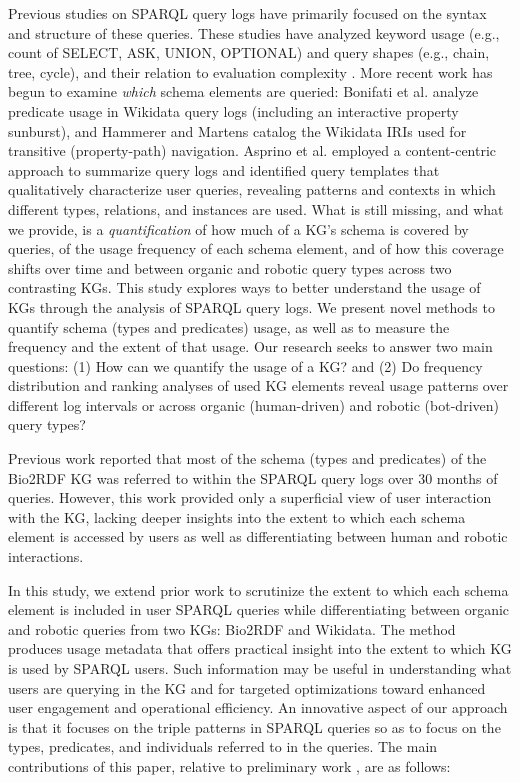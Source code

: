 \documentclass[sw]{iosart2x}
\begin{document}
Previous studies on SPARQL query logs have primarily focused on the syntax and structure of these queries. These studies have analyzed keyword usage (e.g., count of SELECT, ASK, UNION, OPTIONAL) and query shapes (e.g., chain, tree, cycle), and their relation to evaluation complexity \cite{bonifati2020analytical, buil2015preliminary, saleem2015lsq,stadler2024lsq}. More recent work has begun to examine \emph{which} schema elements are queried: Bonifati et al. \cite{bonifati2019navigating} analyze predicate usage in Wikidata query logs (including an interactive property sunburst), and Hammerer and Martens \cite{hammerer2025compendium} catalog the Wikidata IRIs used for transitive (property-path) navigation. Asprino et al. \cite{asprino2023your} employed a content-centric approach to summarize query logs and identified query templates that qualitatively characterize user queries, revealing patterns and contexts in which different types, relations, and instances are used. What is still missing, and what we provide, is a \emph{quantification} of how much of a KG's schema is covered by queries, of the usage frequency of each schema element, and of how this coverage shifts over time and between organic and robotic query types across two contrasting KGs.
This study explores ways to better understand the usage of KGs through the analysis of SPARQL query logs. We present novel methods to quantify schema (types and predicates) usage, as well as to measure the frequency and the extent of that usage. Our research seeks to answer two main questions: (1) How can we quantify the usage of a KG? and (2) Do frequency distribution and ranking analyses of used KG elements reveal usage patterns over different log intervals or across organic (human-driven) and robotic (bot-driven) query types?

Previous work \cite{mohammadi2024analyzing} reported that most of the schema (types and predicates) of the Bio2RDF KG was referred to within the SPARQL query logs over 30 months of queries. However, this work provided only a superficial view of user interaction with the KG, lacking deeper insights into the extent to which each schema element is accessed by users as well as differentiating between human and robotic interactions. 

In this study, we extend prior work \cite{mohammadi2024analyzing} to scrutinize the extent to which each schema element is included in user SPARQL queries while differentiating between organic and robotic queries from two KGs: Bio2RDF and Wikidata. The method produces usage metadata that offers practical insight into the extent to which KG is used by SPARQL users. Such information may be useful in understanding what users are querying in the KG and for targeted optimizations toward enhanced user engagement and operational efficiency. 
An innovative aspect of our approach is that it focuses on the triple patterns in SPARQL queries so as to focus on the types, predicates, and individuals referred to in the queries. The main contributions of this paper, relative to preliminary work \cite{mohammadi2024analyzing}, are as follows:
\end{document}
